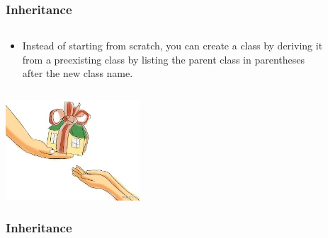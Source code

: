 \documentclass{beamer}
\begin{document}
\begin{frame}
	\frametitle{Inheritance}
	\begin{columns}[c]
		\begin{column}{30cm}
			\vspace{.1cm}
			\begin{itemize}
				\justifying
				\item Instead of starting from scratch, you can create a class by deriving it \\
				from a preexisting class by listing the parent class in parentheses \\
				after the new class name.
			\end{itemize}
		\end{column}
	\end{columns}
	\vspace{.5cm}
	\hspace*{5.5cm} \includegraphics[width=5cm]{figs/Inheritance.jpg}
\end{frame}

\begin{frame}[fragile]
	\frametitle{Inheritance}
	\begin{columns}[c]
		\begin{column}{30cm}
			\vspace{.05cm}
		\end{column}
	\end{columns}
\end{frame}
\end{document}
